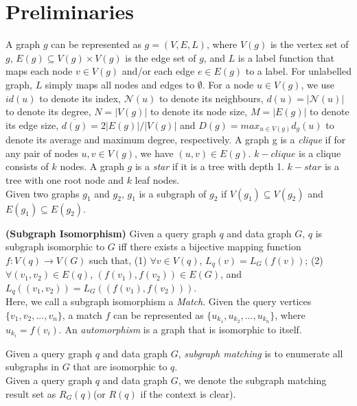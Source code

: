 \section{Preliminaries}
\label{sec:prelim}
A graph $g$ can be represented as $g=(V, E, L)$, where $V(g)$ is the vertex set of $g$, $E(g) \subseteq V(g) \times V(g)$ is the edge set of $g$, and $L$ is a label function that maps each node $v\in V(g)$ and/or each edge $e \in E(g)$ to a label. For unlabelled graph, $L$ simply maps all nodes and edges to $\emptyset$. For a node $u\in V(g)$, we use $id(u)$ to denote its index, $\mathcal{N}(u)$ to denote its neighbours, $d(u)=|\mathcal{N}(u)|$ to denote its degree, $N=|V(g)|$ to denote its node size, $M=|E(g)|$ to denote its edge size, $\overline{d(g)} = 2|E(g)|/|V(g)|$ and $D(g) = max_{u\in V(g)}d_g(u)$ to denote its average and maximum degree, respectively. A graph g is a \textit{clique} if for any pair of nodes $u, v \in V(g)$, we have $(u, v) \in E(g)$. $k-clique$ is a clique consists of $k$ nodes. A graph $g$ is a \textit{star} if it is a tree with depth 1. $k-star$ is a tree with one root node and $k$ leaf nodes.\\

Given two graphs $g_1$ and $g_2$, $g_1$ is a subgraph of $g_2$ if $V(g_1) \subseteq V(g_2)$ and $E(g_1) \subseteq E(g_2)$.\\

\begin{definition}
\label{def:isomorphism}{\textbf{(Subgraph Isomorphism)}} Given a query graph $q$ and data graph $G$, $q$ is subgraph isomorphic to $G$ iff there exists a bijective mapping function $f: V(q) \rightarrow V(G)$ such that, (1) $\forall v \in V(q)$, $L_q(v) = L_{G}(f(v))$; (2) $\forall (v_1, v_2) \in E(q)$, $(f(v_1), f(v_2)) \in E(G)$, and $L_q((v_1, v_2)) = L_{G}((f(v_1), f(v_2)))$. \\

Here, we call a subgraph isomorphism a \textit{Match}. Given the query vertices $\{v_1, v_2, ..., v_n\}$, a match $f$ can be represented as $\{u_{k_1}, u_{k_2}, ..., u_{k_n}\}$, where $u_{k_i} = f(v_i)$. An \textit{automorphism} is a graph that is isomorphic to itself.
\end{definition}

 Given a query graph $q$ and data graph $G$, \textit{subgraph matching} is to enumerate all subgraphs in $G$ that are isomorphic to $q$.\\

Given a query graph $q$ and data graph $G$, we denote the subgraph matching result set as $R_G(q)$(or $R(q)$ if the context is clear).\\

